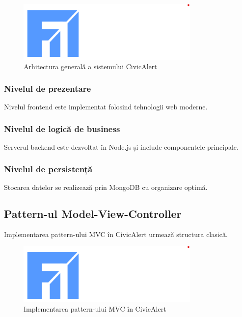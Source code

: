 \documentclass[12pt,a4paper]{report}
\begin{document}
\begin{figure}[H]
\centering
\includegraphics[width=0.8\textwidth]{logo_uaic.png}
\caption{Arhitectura generală a sistemului CivicAlert}
\label{fig:arhitectura_generala}
\end{figure}

\subsubsection{Nivelul de prezentare}

Nivelul frontend este implementat folosind tehnologii web moderne.

\subsubsection{Nivelul de logică de business}

Serverul backend este dezvoltat în Node.js și include componentele principale.

\subsubsection{Nivelul de persistență}

Stocarea datelor se realizează prin MongoDB cu organizare optimă.

\subsection{Pattern-ul Model-View-Controller}

Implementarea pattern-ului MVC în CivicAlert urmează structura clasică.

\begin{figure}[H]
\centering
\includegraphics[width=0.8\textwidth]{logo_uaic.png}
\caption{Implementarea pattern-ului MVC în CivicAlert}
\label{fig:mvc_implementation}
\end{figure}
\end{document}
